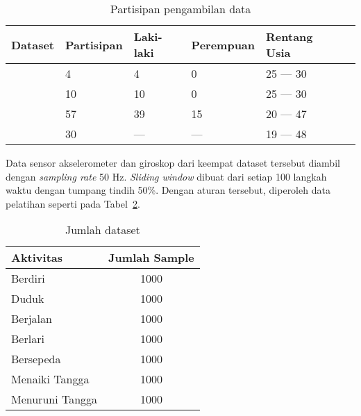\begin{table}[h!]
    \centering
    \caption{Partisipan pengambilan data}
    \begin{tabular}{ |l|l|l|l|l|l| }
        \hline
        \textbf{Dataset} & \textbf{Partisipan} & \textbf{Laki-laki} & \textbf{Perempuan} & \textbf{Rentang Usia} \\

        \hline
        \citet{shoaib-2013} & 4 & 4 & 0 & 25 --- 30 \\

        \hline
        \citet{shoaib-2014} & 10 & 10 & 0 & 25 --- 30 \\

        \hline
        \citet{vavoulas-2016} & 57 & 39 & 15 & 20 --- 47 \\

        \hline
        \citet{anguita-2013} & 30 & --- & --- & 19 --- 48 \\

        \hline
    \end{tabular}
    \label{table:partisipan-dataset}
\end{table}

Data sensor akselerometer dan giroskop dari keempat dataset tersebut diambil dengan \textit{sampling rate} 50 Hz. \textit{Sliding window} dibuat dari setiap 100 langkah waktu dengan tumpang tindih 50\%. Dengan aturan tersebut, diperoleh data pelatihan seperti pada Tabel~\ref{table:jumlah-dataset}.

\begin{table}[h!]
    \centering
    \caption{Jumlah dataset}
    \begin{tabular}{ |l|c| }
        \hline
        \textbf{Aktivitas} & \textbf{Jumlah Sample} \\

        \hline
        Berdiri & 1000 \\

        \hline
        Duduk & 1000 \\

        \hline
        Berjalan & 1000 \\

        \hline
        Berlari & 1000 \\

        \hline
        Bersepeda & 1000 \\

        \hline
        Menaiki Tangga & 1000 \\

        \hline
        Menuruni Tangga & 1000 \\

        \hline
    \end{tabular}
    \label{table:jumlah-dataset}
\end{table}

